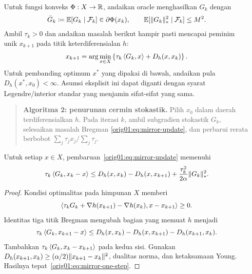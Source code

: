 Untuk fungsi konveks $\Phi:X\to\mathbb{R}$, andaikan oracle menghasilkan $G_k$
dengan
\begin{equation}
  \label{orig01:eq:mirror-oracle}
  \bar G_k\coloneqq\mathbb{E}[G_k\mid\mathcal F_k]\in\partial\Phi(x_k),
  \qquad
  \mathbb{E}[\|G_k\|_*^2\mid\mathcal F_k]\leq M^2.
\end{equation}
Ambil $\tau_k>0$ dan andaikan masalah berikut hampir pasti mencapai peminim
unik $x_{k+1}$ pada titik keterdiferensialan $h$:
\begin{equation}
  \label{orig01:eq:mirror-update}
  x_{k+1}=\arg\min_{x\in X}
  \left\{\tau_k\left\langle G_k , x\right\rangle+D_h(x,x_k)\right\}.
\end{equation}
Untuk pembanding optimum $x^*$ yang dipakai di bawah, andaikan pula
$D_h(x^*,x_0)<\infty$. Asumsi eksplisit ini dapat diganti dengan syarat
Legendre/interior standar yang menjamin sifat-sifat yang sama.

\begin{quote}
\textbf{Algoritma 2: penurunan cermin stokastik.}
Pilih $x_0$ dalam daerah terdiferensialkan $h$. Pada iterasi $k$, ambil
subgradien stokastik $G_k$, selesaikan masalah Bregman
\eqref{orig01:eq:mirror-update}, dan perbarui rerata berbobot
$\sum_j\tau_jx_j/\sum_j\tau_j$.
\end{quote}

\begin{lemma}
  \label{orig01:lemma:mirror-one-step}
  Untuk setiap $x\in X$, pembaruan~\eqref{orig01:eq:mirror-update} memenuhi
  \begin{equation}
    \label{orig01:eq:mirror-one-step}
    \tau_k\left\langle G_k , x_k-x\right\rangle
    \leq D_h(x,x_k)-D_h(x,x_{k+1})
    +\frac{\tau_k^2}{2\alpha}\|G_k\|_*^2.
  \end{equation}
\end{lemma}

\begin{proof}
  Kondisi optimalitas pada himpunan $X$ memberi
  \begin{equation}
    \left\langle\tau_kG_k+\nabla h(x_{k+1})-\nabla h(x_k) , x-x_{k+1}\right\rangle\geq0.
  \end{equation}
  Identitas tiga titik Bregman mengubah bagian yang memuat $h$ menjadi
  \begin{equation}
    \tau_k\left\langle G_k , x_{k+1}-x\right\rangle
    \leq D_h(x,x_k)-D_h(x,x_{k+1})-D_h(x_{k+1},x_k).
  \end{equation}
  Tambahkan $\tau_k\left\langle G_k , x_k-x_{k+1}\right\rangle$ pada kedua sisi. Gunakan
  $D_h(x_{k+1},x_k)\geq(\alpha/2)\|x_{k+1}-x_k\|^2$, dualitas norma, dan
  ketaksamaan Young. Hasilnya tepat~\eqref{orig01:eq:mirror-one-step}.
\end{proof}

